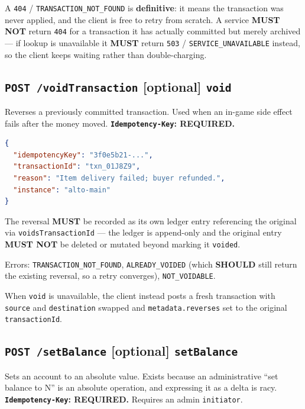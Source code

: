 \documentclass[11pt,a4paper]{article}
\newcommand{\code}[1]{\texttt{\small #1}}
\newcommand{\req}{\textbf{MUST}}
\newcommand{\rec}{\textbf{SHOULD}}
\newcommand{\optional}{{\small\color{omceMuted}\textbf{[optional]}}}
\begin{document}
A \code{404} / \code{TRANSACTION\_NOT\_FOUND} is \textbf{definitive}: it means the transaction was
never applied, and the client is free to retry from scratch. A service \textbf{MUST NOT} return
\code{404} for a transaction it has actually committed but merely archived --- if lookup is
unavailable it \req{} return \code{503} / \code{SERVICE\_UNAVAILABLE} instead, so the client keeps
waiting rather than double-charging.

\subsection{\code{POST /voidTransaction} \optional{} \code{void}}

Reverses a previously committed transaction. Used when an in-game side effect fails after the money
moved. \textbf{\code{Idempotency-Key}: REQUIRED.}

\begin{lstlisting}[language=json]
{
  "idempotencyKey": "3f0e5b21-...",
  "transactionId": "txn_01J8Z9",
  "reason": "Item delivery failed; buyer refunded.",
  "instance": "alto-main"
}
\end{lstlisting}

The reversal \req{} be recorded as its own ledger entry referencing the original via
\code{voidsTransactionId} --- the ledger is append-only and the original entry \textbf{MUST NOT} be
deleted or mutated beyond marking it \code{voided}.

Errors: \code{TRANSACTION\_NOT\_FOUND}, \code{ALREADY\_VOIDED} (which \rec{} still return the
existing reversal, so a retry converges), \code{NOT\_VOIDABLE}.

When \code{void} is unavailable, the client instead posts a fresh transaction with \code{source}
and \code{destination} swapped and \code{metadata.reverses} set to the original
\code{transactionId}.

\subsection{\code{POST /setBalance} \optional{} \code{setBalance}}

Sets an account to an absolute value. Exists because an administrative ``set balance to N'' is an
absolute operation, and expressing it as a delta is racy.
\textbf{\code{Idempotency-Key}: REQUIRED.} Requires an admin \code{initiator}.
\end{document}
